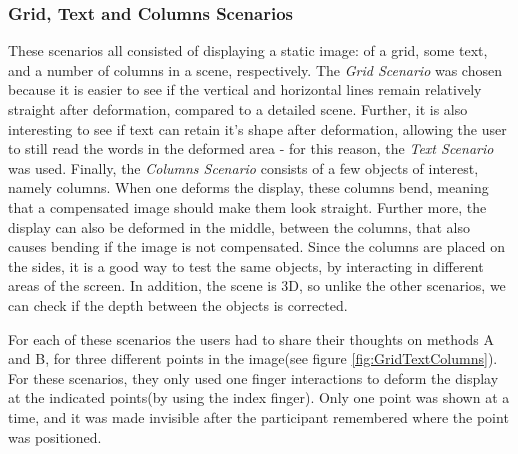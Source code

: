 \documentclass[]{article}
\begin{document}
\subsubsection{Grid, Text and Columns Scenarios}

 These scenarios all consisted of displaying a static image: of a grid, some text, and a number of columns in a scene, respectively. The \textit{Grid Scenario} was chosen because it is easier to see if the vertical and horizontal lines remain relatively straight after deformation, compared to a detailed scene. Further, it is also interesting to see if text can retain it's shape after deformation, allowing the user to still read the words in the deformed area - for this reason, the \textit{Text Scenario} was used. Finally, the \textit{Columns Scenario} consists of a few objects of interest, namely columns. When one deforms the display, these columns bend, meaning that a compensated image should make them look straight. Further more, the display can also be deformed in the middle, between the columns, that also causes bending if the image is not compensated. Since the columns are placed on the sides, it is a good way to test the same objects, by interacting in different areas of the screen. In addition, the scene is 3D, so unlike the other scenarios, we can check if the depth between the objects is corrected.

 For each of these scenarios the users had to share their thoughts on methods A and B, for three different points in the image(see figure \ref{fig:GridTextColumns}). For these scenarios, they only used one finger interactions to deform the display at the indicated points(by using the index finger). Only one point was shown at a time, and it was made invisible after the participant remembered where the point was positioned.
\end{document}

